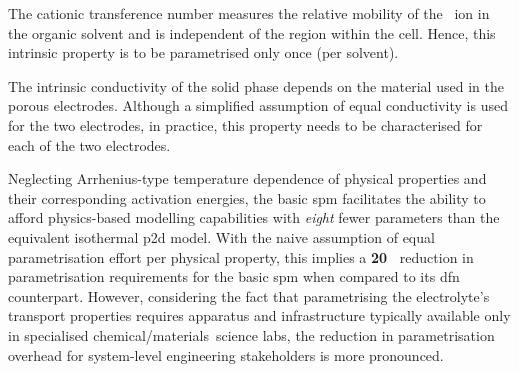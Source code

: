\begin{enumdescriptnum}[leftmargin=!,itemsep=1ex,labelwidth=\widthof{$\symbf{\text{brugg}_j}\ \scriptstyle (\times 3)$abc}
    ,partopsep=0pt
    ,topsep=0pt
    ]
      The  cationic transference  number
    measures the relative  mobility of the ~ion in  the organic solvent
    and is  independent of  the region  within the  cell. Hence,  this intrinsic
    property is to be parametrised only once (per solvent).

      The  intrinsic conductivity  of
    the  solid phase  depends on  the material  used in  the porous  electrodes.
    Although a simplified  assumption of equal conductivity is used  for the two
    electrodes, in practice, this property needs to be characterised for each of
    the two electrodes.

\end{enumdescriptnum}

  Neglecting  Arrhenius-type temperature  dependence
of  physical  properties  and   their  corresponding  activation  energies,  the
basic  \gls{spm}  facilitates  the  ability to  afford  physics-based  modelling
capabilities with  \emph{eight} fewer parameters than  the equivalent isothermal
\gls{p2d} model. With  the naive assumption of equal  parametrisation effort per
physical property, this  implies a \textbf{\SI{20}{\textbf{\percent}}} reduction
in  parametrisation  requirements  for  the basic  \gls{spm}  when  compared  to
its  \gls{dfn} counterpart.  However,  considering the  fact that  parametrising
the  electrolyte's transport  properties requires  apparatus and  infrastructure
typically  available only  in specialised  chemical/materials~science labs,  the
reduction in parametrisation overhead  for system-level engineering stakeholders
is more pronounced.


